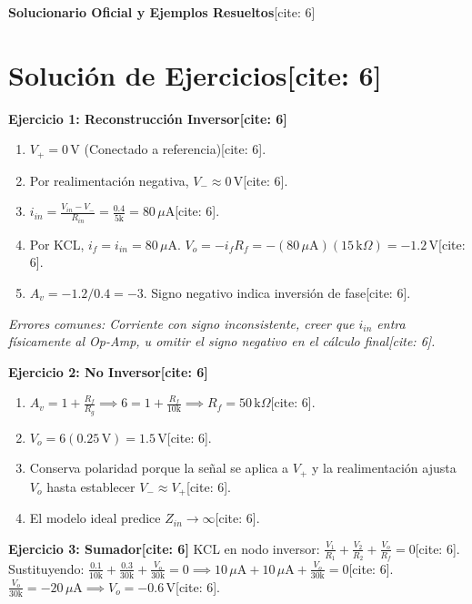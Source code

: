 \documentclass[11pt, a4paper]{article}
\begin{document}
\begin{center}
    \Large\textbf{\textcolor{ucbblue}{Solucionario Oficial y Ejemplos Resueltos}}[cite: 6]
\end{center}

\section*{Solución de Ejercicios[cite: 6]}

\textbf{Ejercicio 1: Reconstrucción Inversor[cite: 6]}
\begin{enumerate}
    \item $V_+ = 0\,\text{V}$ (Conectado a referencia)[cite: 6].
    \item Por realimentación negativa, $V_- \approx 0\,\text{V}$[cite: 6].
    \item $i_{in} = \frac{V_{in} - V_-}{R_{in}} = \frac{0.4}{5\text{k}} = 80\,\mu\text{A}$[cite: 6].
    \item Por KCL, $i_f = i_{in} = 80\,\mu\text{A}$. $V_o = -i_f R_f = -(80\,\mu\text{A})(15\,\text{k}\Omega) = \boxed{-1.2\,\text{V}}$[cite: 6].
    \item $A_v = -1.2 / 0.4 = \boxed{-3}$. Signo negativo indica inversión de fase[cite: 6].
\end{enumerate}
\textit{Errores comunes: Corriente con signo inconsistente, creer que $i_{in}$ entra físicamente al Op-Amp, u omitir el signo negativo en el cálculo final[cite: 6].}

\vspace{0.3cm}
\textbf{Ejercicio 2: No Inversor[cite: 6]}
\begin{enumerate}
    \item $A_v = 1 + \frac{R_f}{R_g} \implies 6 = 1 + \frac{R_f}{10\text{k}} \implies \boxed{R_f = 50\,\text{k}\Omega}$[cite: 6].
    \item $V_o = 6(0.25\,\text{V}) = \boxed{1.5\,\text{V}}$[cite: 6].
    \item Conserva polaridad porque la señal se aplica a $V_+$ y la realimentación ajusta $V_o$ hasta establecer $V_- \approx V_+$[cite: 6].
    \item El modelo ideal predice $\boxed{Z_{in} \rightarrow \infty}$[cite: 6].
\end{enumerate}

\vspace{0.3cm}
\textbf{Ejercicio 3: Sumador[cite: 6]}
KCL en nodo inversor: $\frac{V_1}{R_1} + \frac{V_2}{R_2} + \frac{V_o}{R_f} = 0$[cite: 6]. \\
Sustituyendo: $\frac{0.1}{10\text{k}} + \frac{0.3}{30\text{k}} + \frac{V_o}{30\text{k}} = 0 \implies 10\,\mu\text{A} + 10\,\mu\text{A} + \frac{V_o}{30\text{k}} = 0$[cite: 6]. \\
$\frac{V_o}{30\text{k}} = -20\,\mu\text{A} \implies \boxed{V_o = -0.6\,\text{V}}$[cite: 6].
\end{document}
